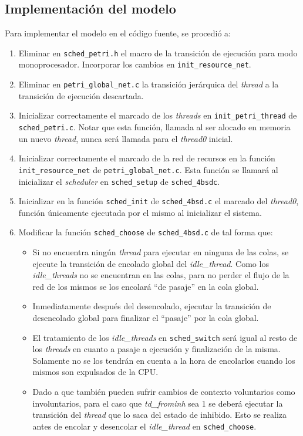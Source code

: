 \documentclass[a4paper]{book}
\begin{document}
\subsection{Implementaci\'on del modelo}
Para implementar el modelo en el c\'odigo fuente, se procedi\'o a:
\begin{enumerate}
\item Eliminar en \verb|sched_petri.h| el macro de la transición de ejecuci\'on para modo monoprocesador. Incorporar los cambios en  \verb|init_resource_net|.
\item Eliminar en \verb|petri_global_net.c| la transici\'on jer\'arquica del \emph{thread} a la transici\'on de ejecuci\'on descartada.
\item Inicializar correctamente el marcado de los \emph{threads} en \verb|init_petri_thread| de \verb|sched_petri.c|. Notar que esta funci\'on, llamada al ser alocado en memoria un nuevo \emph{thread}, nunca ser\'a llamada para el \emph{thread0} inicial.
\item Inicializar correctamente el marcado de la red de recursos en la funci\'on \verb|init_resource_net| de \verb|petri_global_net.c|. Esta funci\'on se llamar\'a al inicializar el \emph{scheduler} en \verb|sched_setup| de \verb|sched_4bsdc|.
\item Inicializar en la funci\'on \verb|sched_init| de \verb|sched_4bsd.c| el marcado del \emph{thread0}, funci\'on \'unicamente ejecutada por el mismo al inicializar el sistema.
\item Modificar la funci\'on \verb|sched_choose| de \verb|sched_4bsd.c| de tal forma que:
\begin{itemize}
\item Si no encuentra ning\'un \emph{thread} para ejecutar en ninguna de las colas, se ejecute la transici\'on de encolado global del \emph{idle\_thread}. Como los \emph{idle\_threads} no se encuentran en las colas, para no perder el flujo de la red de los mismos se los encolar\'a “de pasaje” en la cola global.
\item Inmediatamente despu\'es del desencolado, ejecutar la transici\'on de desencolado global para finalizar el “pasaje” por la cola global.
\item El tratamiento de los \emph{idle\_threads} en \verb|sched_switch| ser\'a igual al resto de los \emph{threads} en cuanto a pasaje a ejecuci\'on y finalizaci\'on de la misma. Solamente no se los tendr\'an en cuenta a la hora de encolarlos cuando los mismos son expulsados de la CPU.
\item Dado a que tambi\'en pueden sufrir cambios de contexto voluntarios como involuntarios, para el caso que \emph{td\_frominh} sea 1 se deber\'a ejecutar la transici\'on del \emph{thread} que lo saca del estado de inhibido. Esto se realiza antes de encolar y desencolar el \emph{idle\_thread} en \verb|sched_choose|.
\end{itemize}
\end{enumerate}
\end{document}
